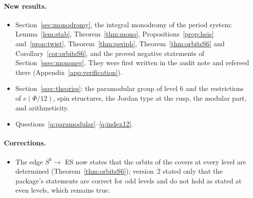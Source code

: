 \paragraph{New results.}
\begin{itemize}
\item Section~\ref{sec:monodromy}, the integral monodromy of the period system: Lemma~\ref{lem:stab}, Theorem~\ref{thm:mono}, Propositions~\ref{prop:heis} and~\ref{prop:twist}, Theorem~\ref{thm:periph}, Theorem~\ref{thm:orbitsS6} and Corollary~\ref{cor:orbitsS6}, and the proved negative statements of Section~\ref{ssec:mononeg}. They were first written in the audit note  and refereed there (Appendix~\ref{app:verification}).
\item Section~\ref{ssec:theories}: the paramodular group of level $6$ and the restrictions of $e(\Phi/12)$, spin structures, the Jordan type at the cusp, the modular part, and arithmeticity.
\item Questions~\ref{q:paramodular}--\ref{q:index12}.
\end{itemize}

\paragraph{Corrections.}
\begin{itemize}
\item The edge $S^6\to$ ES now states that the orbits of the covers at every level are determined (Theorem~\ref{thm:orbitsS6}); version~2 stated only that the package's statements are correct for odd levels and do not hold as stated at even levels, which remains true.
\end{itemize}

